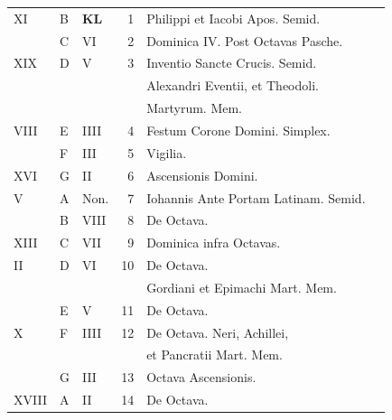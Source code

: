 \begin{center}
\begin{tabular}{l | l | l | r | l l}
\color{Red} XI & B & \textbf{\color{Red} K\color{Blue}L} & 1 & Philippi et Iacobi Apos. Semid. \\
\color{Red}  & C & \color{Red} VI & 2 & \color{Red} Dominica IV. Post Octavas Pasche. \\
\color{Red} XIX & D & \color{Red} V & 3 & Inventio Sancte Crucis. Semid. \\
 &  &  &  & \multicolumn{2}{l}{\quad Alexandri Eventii, et Theodoli.} \\
 &  &  &  & \quad \color{Red} Martyrum. \color{black} Mem. \\
\color{Red} VIII & E & \color{Red} IIII & 4 & Festum Corone Domini. Simplex. & \color{Red} \\
\color{Red}  & F & \color{Red} III & 5 & \color{Red} Vigilia. \\
\color{Red} XVI & G & \color{Red} II & 6 & \color{Red} Ascensionis Domini. \\
\color{Red} V & \color{Red} A & \color{Red} Non. & 7 & \color{Red} Iohannis Ante Portam Latinam. Semid. \\
\color{Red}  & B & \color{Red} VIII & 8 & De Octava. & \color{Red} \\
\color{Red} XIII & C & \color{Red} VII & 9 & Dominica infra Octavas. & \color{Red} \\
\color{Red} II & D & \color{Red} VI & 10 & De Octava. \\
 &  &  &  & \quad Gordiani et Epimachi Mart. Mem. \\
\color{Red}  & E & \color{Red} V & 11 & De Octava. & \color{Red} \\
\color{Red} X & F & \color{Red} IIII & 12 & De Octava. \quad Neri, Achillei, \\
 &  &  &  & \quad et Pancratii Mart. Mem. \\
\color{Red}  & G & \color{Red} III & 13 & \color{Red} Octava Ascensionis. \\
\color{Red} XVIII & \color{Red} A & \color{Red} II & 14 & De Octava. & \color{Red} \\

\end{tabular}
\end{center}

